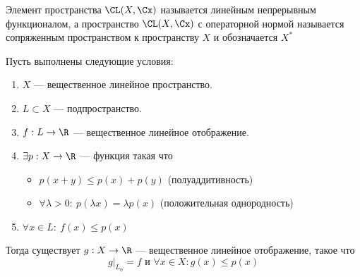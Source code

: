 \begin{definition}
	Элемент пространства $\CL(X, \Cx)$ называется линейным непрерывным функционалом, а пространство $\CL(X, \Cx)$ с операторной нормой называется сопряженным пространством к пространству $X$ и обозначается $X^*$
\end{definition}

\begin{theorem}\label{th:h-b}
	Пусть выполнены следующие условия:
	\begin{enumerate}
		\item $X$ --- вещественное линейное пространство.
		\item $L \subset X$ --- подпространство.
		\item $f: L \to \R$ --- вещественное линейное отображение.
		\item $\exists p: X \to \R$ --- функция такая что
		\begin{itemize}
			\item $p(x + y) \leq p(x) + p(y)$ (полуаддитивность)
			\item $\forall \lambda > 0: \ p(\lambda x ) = \lambda p(x)$ (положительная однородность)
		\end{itemize}
		\item $\forall x \in L: \ f(x) \leq p(x)$
	\end{enumerate}
	 Тогда существует $g: X \to \R$ --- вещественное линейное отображение, такое что 
	 $$
	 g\big\vert_{L_0} = f \text{ и }  \forall x \in X: g(x) \leq p(x)
	 $$
\end{theorem}
